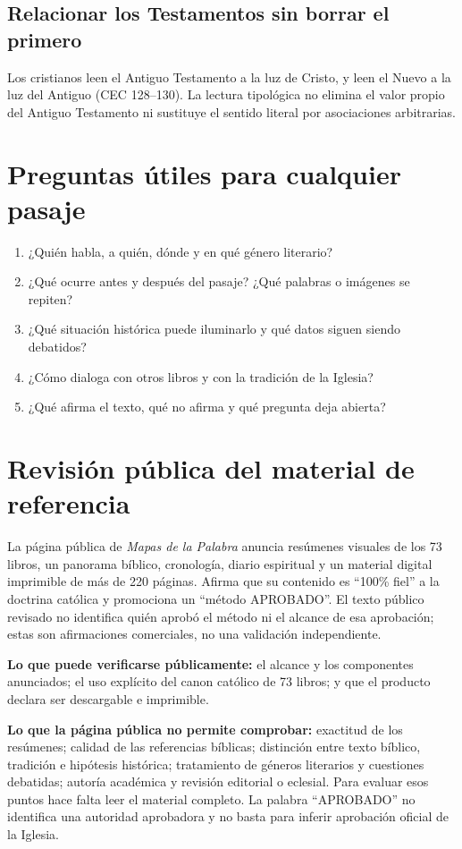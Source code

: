 \documentclass[11pt]{article}
\begin{document}
\subsection{Relacionar los Testamentos sin borrar el primero}
Los cristianos leen el Antiguo Testamento a la luz de Cristo, y leen el Nuevo a la luz del Antiguo (CEC 128--130). La lectura tipológica no elimina el valor propio del Antiguo Testamento ni sustituye el sentido literal por asociaciones arbitrarias.

\section{Preguntas útiles para cualquier pasaje}
\begin{enumerate}[leftmargin=1.2em]
\item ¿Quién habla, a quién, dónde y en qué género literario?
\item ¿Qué ocurre antes y después del pasaje? ¿Qué palabras o imágenes se repiten?
\item ¿Qué situación histórica puede iluminarlo y qué datos siguen siendo debatidos?
\item ¿Cómo dialoga con otros libros y con la tradición de la Iglesia?
\item ¿Qué afirma el texto, qué no afirma y qué pregunta deja abierta?
\end{enumerate}

\section{Revisión pública del material de referencia}
La página pública de \textit{Mapas de la Palabra} anuncia resúmenes visuales de los 73 libros, un panorama bíblico, cronología, diario espiritual y un material digital imprimible de más de 220 páginas. Afirma que su contenido es ``100\% fiel'' a la doctrina católica y promociona un ``método APROBADO''. El texto público revisado no identifica quién aprobó el método ni el alcance de esa aprobación; estas son afirmaciones comerciales, no una validación independiente.

\textbf{Lo que puede verificarse públicamente:} el alcance y los componentes anunciados; el uso explícito del canon católico de 73 libros; y que el producto declara ser descargable e imprimible.

\textbf{Lo que la página pública no permite comprobar:} exactitud de los resúmenes; calidad de las referencias bíblicas; distinción entre texto bíblico, tradición e hipótesis histórica; tratamiento de géneros literarios y cuestiones debatidas; autoría académica y revisión editorial o eclesial. Para evaluar esos puntos hace falta leer el material completo. La palabra ``APROBADO'' no identifica una autoridad aprobadora y no basta para inferir aprobación oficial de la Iglesia.
\end{document}
